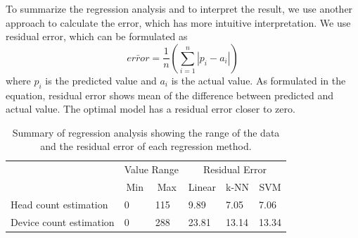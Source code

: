 







To summarize the regression analysis and to interpret the result, we use another approach to calculate the error, which has more intuitive interpretation. We use residual error, which can be formulated as
\begin{equation}\label{eq:residual-error}
	\bar { error } =\frac { 1 }{ n } \left( \sum _{ i=1 }^{ n }{ \left| { p }_{ i }-{ a }_{ i } \right|  }  \right) 
\end{equation}
where ${ p }_{ i }$ is the predicted value and ${ a }_{ i }$ is the actual value. As formulated in the equation, residual error shows mean of the difference between predicted and actual value. The optimal model has a residual error closer to zero.

\begin{table}[h]
\centering
\caption{Summary of regression analysis showing the range of the data and the residual error of each regression method.}
\label{tab:regression-summary}
\begin{tabular}{llllll}
\toprule
                   & \multicolumn{2}{c}{Value Range}                         & \multicolumn{3}{c}{Residual Error}                                                        \\
                   & \multicolumn{1}{c}{Min} & \multicolumn{1}{c}{Max} & \multicolumn{1}{c}{Linear} & \multicolumn{1}{c}{k-NN} & \multicolumn{1}{c}{SVM} \\ \midrule
Head count estimation   & 0                       & 115                     & 9.89                                  & 7.05                    & 7.06                    \\
Device count estimation & 0                       & 288                     & 23.81                                 & 13.14                   & 13.34                  \\ \bottomrule
\end{tabular}
\end{table}

